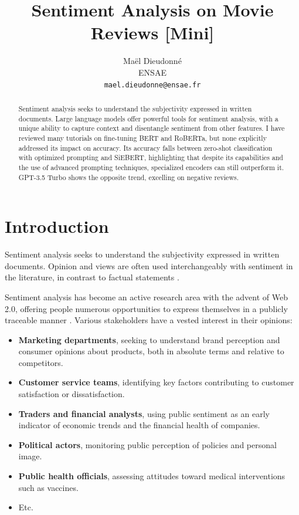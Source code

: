 \documentclass{article}
\title{Sentiment Analysis on Movie Reviews [Mini]}
\author{
  Maël Dieudonné\\
  ENSAE\\
  \texttt{mael.dieudonne@ensae.fr} \\
}
\begin{document}
\maketitle

\begin{abstract}
  Sentiment analysis seeks to understand the subjectivity expressed in written documents. Large language models offer powerful tools for sentiment analysis, with a unique ability to capture context and disentangle sentiment from other features. I have reviewed many tutorials on fine-tuning BERT and RoBERTa, but none explicitly addressed its impact on accuracy. Its accuracy falls between zero-shot classification with optimized prompting and SiEBERT, highlighting that despite its capabilities and the use of advanced prompting techniques, specialized encoders can still outperform it. GPT-3.5 Turbo shows the opposite trend, excelling on negative reviews.
\end{abstract}


\section{Introduction}

Sentiment analysis seeks to understand the subjectivity expressed in written documents. Opinion and views are often used interchangeably with sentiment in the literature, in contrast to factual statements \citep{munezero_are_2014}.

Sentiment analysis has become an active research area with the advent of Web 2.0, offering people numerous opportunities to express themselves in a publicly traceable manner \citep{stine_sentiment_2019}. Various stakeholders have a vested interest in their opinions:
\begin{itemize}
    \item \textbf{Marketing departments}, seeking to understand brand perception and consumer opinions about products, both in absolute terms and relative to competitors.
    \item \textbf{Customer service teams}, identifying key factors contributing to customer satisfaction or dissatisfaction.
    \item \textbf{Traders and financial analysts}, using public sentiment as an early indicator of economic trends and the financial health of companies.
    \item \textbf{Political actors}, monitoring public perception of policies and personal image.
    \item \textbf{Public health officials}, assessing attitudes toward medical interventions such as vaccines.
    \item Etc.
\end{itemize}
\end{document}
